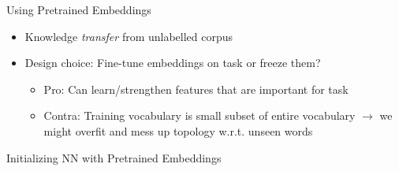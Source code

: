 
\begin{vbframe}{Using Pretrained Embeddings}

\vfill

\begin{itemize}
	\item Knowledge \emph{transfer} from unlabelled corpus
	\item Design choice: Fine-tune embeddings on task or freeze them?
		\begin{itemize}
			\item Pro: Can learn/strengthen features that are important for task
			\item Contra: Training vocabulary is small subset of entire vocabulary $\rightarrow$ we might overfit and mess up topology w.r.t. unseen words
		\end{itemize}
\end{itemize}

\vfill

\end{vbframe}


\begin{vbframe}{Initializing NN with Pretrained Embeddings}

\vfill



\vfill

\end{vbframe}


